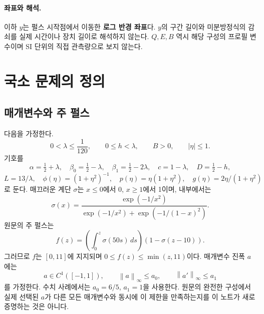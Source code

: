 \documentclass[11pt,a4paper]{article}
\theoremstyle{definition}
\theoremstyle{remark}\newtheorem{remark}[theorem]{주의}
\newcommand{\norm}[1]{\left\lVert #1\right\rVert}
\begin{document}
\paragraph{좌표와 해석.}
이하 $y$는 펄스 시작점에서 이동한 \textbf{로그 반경 좌표}다. $y$의 구간 길이와 미분방정식의 감쇠를 실제 시간이나 장치 길이로 해석하지 않는다. $Q,E,B$ 역시 해당 구성의 프로필 변수이며 SI 단위의 직접 관측량으로 보지 않는다.

\section{국소 문제의 정의}
\subsection{매개변수와 주 펄스}
다음을 가정한다.
\begin{equation}\label{params}
0<\lambda\le\frac1{120},\qquad 0\le h<\lambda,\qquad B>0,\qquad |\eta|\le1.
\end{equation}
기호를
\begin{equation}
\alpha=\tfrac12+\lambda,\quad \beta_0=\tfrac12-\lambda,\quad
\beta_1=\tfrac12-2\lambda,\quad c=1-\lambda,\quad D=\tfrac12-h,
\end{equation}
\begin{equation}
L=13/\lambda,\quad \phi(\eta)=(1+\eta^2)^{-1},\quad
p(\eta)=\eta(1+\eta^2),\quad g(\eta)=2\eta/(1+\eta^2)
\end{equation}
로 둔다. 매끄러운 계단 $\sigma$는 $x\le0$에서 0, $x\ge1$에서 1이며, 내부에서는
\begin{equation}
\sigma(x)=\frac{\exp(-1/x^2)}{\exp(-1/x^2)+\exp(-1/(1-x)^2)}.
\end{equation}
원문의 주 펄스는\cite{schedule}
\begin{equation}\label{mainpulse}
f(z)=\left(\int_0^z\sigma(50s)\,ds\right)(1-\sigma(z-10)).
\end{equation}
그러므로 $f$는 $[0,11]$에 지지되며 $0\le f(z)\le\min(z,11)$이다. 매개변수 진폭 $a$에는
\begin{equation}\label{amp}
 a\in C^1([-1,1]),\qquad \norm a_\infty\le a_0,\qquad
 \norm{a'}_\infty\le a_1
\end{equation}
를 가정한다. 수치 사례에서는 $a_0=6/5$, $a_1=1$을 사용한다. 원문의 완전한 구성에서 실제 선택된 $a$가 다른 모든 매개변수와 동시에 이 제한을 만족하는지를 이 노트가 새로 증명하는 것은 아니다.
\end{document}

